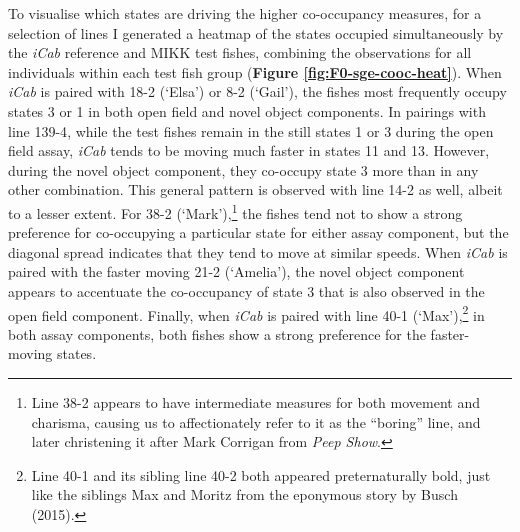 \documentclass[
]{book}
\begin{document}
To visualise which states are driving the higher co-occupancy measures, for a selection of lines I generated a heatmap of the states occupied simultaneously by the \emph{\textcolor{iCab_424B4D}{iCab}} reference and MIKK test fishes, combining the observations for all individuals within each test fish group (\textbf{Figure \ref{fig:F0-sge-cooc-heat}}). When \emph{\textcolor{iCab_424B4D}{iCab}} is paired with \textcolor{18-2 (‘Elsa’)_FF66A6}{18-2 (‘Elsa’)} or \textcolor{8-2 (‘Gail’)_FF699C}{8-2 (‘Gail’)}, the fishes most frequently occupy states 3 or 1 in both open field and novel object components. In pairings with line \textcolor{139-4_FF61CC}{139-4}, while the test fishes remain in the still states 1 or 3 during the open field assay, \emph{\textcolor{iCab_424B4D}{iCab}} tends to be moving much faster in states 11 and 13. However, during the novel object component, they co-occupy state 3 more than in any other combination. This general pattern is observed with line \textcolor{14-2_F066EA}{14-2} as well, albeit to a lesser extent. For \textcolor{38-2 (‘Mark’)_00C08B}{38-2 (‘Mark’)},\footnote{Line 38-2 appears to have intermediate measures for both movement and charisma, causing us to affectionately refer to it as the ``boring'' line, and later christening it after Mark Corrigan from \emph{Peep Show}.} the fishes tend not to show a strong preference for co-occupying a particular state for either assay component, but the diagonal spread indicates that they tend to move at similar speeds. When \emph{\textcolor{iCab_424B4D}{iCab}} is paired with the faster moving \textcolor{21-2 (‘Amelia’)_49B500}{21-2 (‘Amelia’)}, the novel object component appears to accentuate the co-occupancy of state 3 that is also observed in the open field component. Finally, when \emph{\textcolor{iCab_424B4D}{iCab}} is paired with line \textcolor{40-1 (‘Max’)_93AA00}{40-1 (‘Max’)},\footnote{Line 40-1 and its sibling line 40-2 both appeared preternaturally bold, just like the siblings Max and Moritz from the eponymous story by Busch (2015).} in both assay components, both fishes show a strong preference for the faster-moving states.
\end{document}
